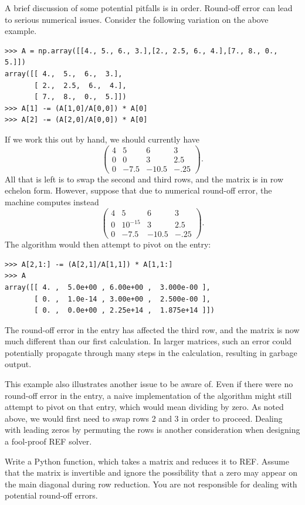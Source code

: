 A brief discussion of some potential pitfalls is in order.
Round-off error can lead to serious numerical issues. Consider the
following variation on the above example.
\begin{lstlisting}
>>> A = np.array([[4., 5., 6., 3.],[2., 2.5, 6., 4.],[7., 8., 0., 5.]])
array([[ 4.,  5.,  6.,  3.],
       [ 2.,  2.5,  6.,  4.],
       [ 7.,  8.,  0.,  5.]])
>>> A[1] -= (A[1,0]/A[0,0]) * A[0]
>>> A[2] -= (A[2,0]/A[0,0]) * A[0]
\end{lstlisting}
If we work this out by hand, we should currently have
\[
\begin{pmatrix}
4&5&6&3 \\
0&0&3&2.5 \\
0&-7.5&-10.5&-.25
\end{pmatrix}.
\]
All that is left is to swap the second and third rows, and the matrix is in
row echelon form. However, suppose that due to numerical round-off error,
the machine computes instead
\[
\begin{pmatrix}
4&5&6&3 \\
0&10^{-15}&3&2.5 \\
0&-7.5&-10.5&-.25
\end{pmatrix}.
\]
The algorithm would then attempt to pivot on the  entry:
\begin{lstlisting}
>>> A[2,1:] -= (A[2,1]/A[1,1]) * A[1,1:]
>>> A
array([[ 4. ,  5.0e+00 , 6.00e+00 ,  3.000e-00 ],
       [ 0. ,  1.0e-14 , 3.00e+00 ,  2.500e-00 ],
       [ 0. ,  0.0e+00 , 2.25e+14 ,  1.875e+14 ]])
\end{lstlisting}
The round-off error in the  entry has affected the third
row, and the matrix is now much different than our first calculation. In
larger matrices, such an error could potentially propagate through many
steps in the calculation, resulting in garbage output.

This example also illustrates another issue to be aware of. Even if there
were no round-off error in the  entry, a naive implementation of
the algorithm might still attempt to pivot on that entry, which would mean
dividing by zero. As noted above, we would first need to swap rows 2 and 3
in order to proceed. Dealing with leading zeros by permuting the rows is
another consideration when designing a fool-proof REF solver.

\begin{problem}
\label{prob:REF}
Write a Python function, which takes a matrix and reduces it to REF.
Assume that the matrix is invertible and ignore the possibility that a zero may appear on the main diagonal during row reduction. You are not
responsible for dealing with potential round-off errors.
\end{problem}


